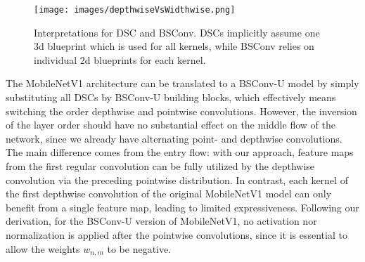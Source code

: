 \documentclass[10pt,twocolumn,letterpaper]{article}
\newcommand{\DCCK}{BSConv\xspace}
\newcommand{\DCCKU}{\DCCK-U\xspace}
\newcommand{\weight}{w}
\newcommand{\channelInIndex}{m}
\newcommand{\channelOutIndex}{n}
\begin{document}
\begin{figure}
	\center
	\texttt{[image: images/depthwiseVsWidthwise.png]}
	\caption{Interpretations for DSC and \DCCK.
		DSCs implicitly assume one 3d blueprint which is used for all kernels, while \DCCK relies on individual 2d blueprints for each kernel.
	}
	\label{fig:depthwiseVsWidthwise}
\end{figure}

The MobileNetV1 architecture can be translated to a \DCCKU model by simply substituting all DSCs by \DCCKU building blocks, which effectively means switching the order depthwise and pointwise convolutions.
However, the inversion of the layer order should have no substantial effect on the middle flow of the network, since we already have alternating point- and depthwise convolutions.
The main difference comes from the entry flow: with our approach, feature maps from the first regular convolution can be fully utilized by the depthwise convolution via the preceding pointwise distribution.
In contrast, each kernel of the first depthwise convolution of the original MobileNetV1 model can only benefit from a single feature map, leading to limited expressiveness.
Following our derivation, for the \DCCKU version of MobileNetV1, no activation nor normalization is applied after the pointwise convolutions, since it is essential to allow the weights $\weight_{\channelOutIndex, \channelInIndex}$ to be negative.
\end{document}

